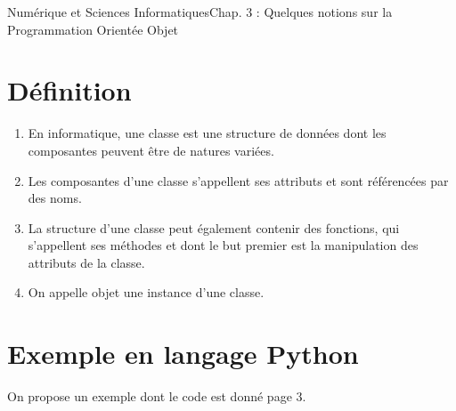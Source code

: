 \documentclass[11pt,a4paper,french,twoside]{PMCours}
\begin{document}
{Numérique et Sciences Informatiques}{Chap. 3 : Quelques notions sur la 
Programmation Orientée Objet}
\section{Définition}
\begin{Definition}{}
\begin{enumerate}
\item En informatique, une {\color{red} classe} est une structure de données dont 
les composantes peuvent être de natures variées. 
\item Les composantes d'une classe s'appellent ses {\color{red} attributs} et 
sont référencées par des noms.
\item La structure d'une classe peut également contenir des fonctions, qui 
s'appellent ses {\color{red} méthodes} et dont le but premier est la manipulation 
des attributs de la classe.
\item On appelle {\color{red} objet} une instance d'une classe.
\end{enumerate}
\end{Definition}

\section{Exemple en langage Python}
On propose un exemple dont le code est donné page 3.
\end{document}
